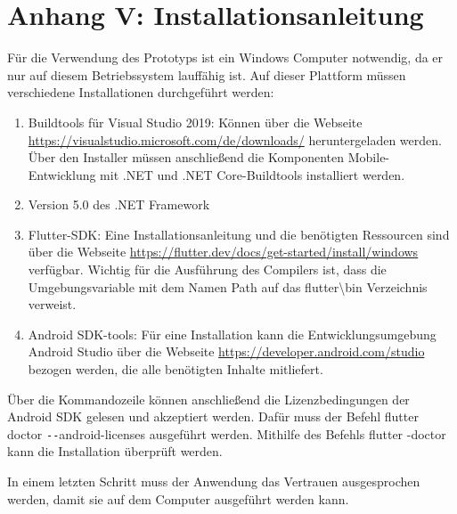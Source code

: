 \chapter{Anhang V: Installationsanleitung}
\label{chap:Installationsanleitung}

Für die Verwendung des Prototyps ist ein Windows Computer notwendig,  da er nur auf diesem Betriebssystem lauffähig ist.  
Auf dieser Plattform müssen verschiedene Installationen durchgeführt werden:

\begin{enumerate}
\setlength\itemsep{-0.6em}
	\item Buildtools für Visual Studio 2019: Können über die Webseite \url{https://visualstudio.microsoft.com/de/downloads/} heruntergeladen 				werden.  Über den Installer müssen anschließend die Komponenten \glqq Mobile-Entwicklung mit .NET\grqq{} und \glqq .NET 				Core-Buildtools\grqq{} installiert werden.	
	\item Version 5.0 des .NET Framework
	\item Flutter-SDK:  Eine Installationsanleitung und die benötigten Ressourcen sind über die Webseite \url{https://flutter.dev/docs/get-started/install/windows} verfügbar.  Wichtig für die Ausführung des Compilers ist,  dass die Umgebungsvariable mit dem Namen \glq Path\grq{}  auf das \glqq flutter\textbackslash bin\grqq{} Verzeichnis verweist. 
	\item Android SDK-tools: Für eine Installation kann die Entwicklungsumgebung Android Studio über die Webseite \url{https://developer.android.com/studio} bezogen werden,  die alle benötigten Inhalte mitliefert. 
 
\end{enumerate}


Über die Kommandozeile können anschließend die Lizenzbedingungen der Android SDK gelesen und akzeptiert werden.  Dafür muss der Befehl \glqq flutter doctor \texttt{-{}-}android-licenses\grqq{} ausgeführt werden.  Mithilfe des  Befehls \glqq flutter -doctor\grqq{} kann die Installation überprüft werden.

In einem letzten Schritt muss der Anwendung das Vertrauen ausgesprochen werden, damit sie auf dem Computer ausgeführt werden kann.
